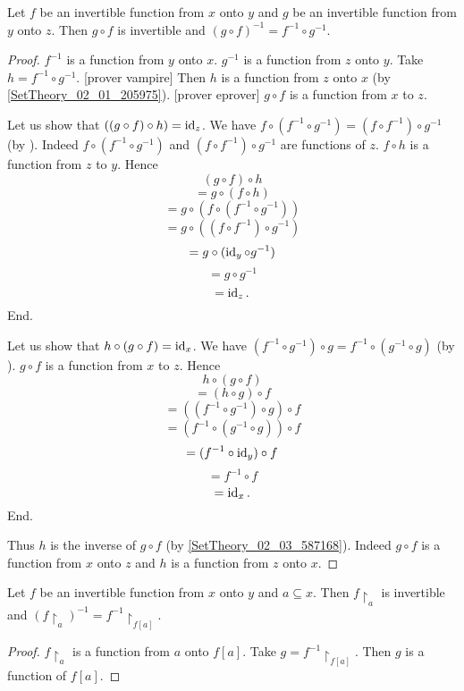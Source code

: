 \documentclass[../../set-theory.tex]{subfiles}
\begin{document}
\begin{forthel}
    \begin{proposition}\label{SetTheory_02_03_430030}
      Let $f$ be an invertible function from $x$ onto $y$ and $g$ be an invertible function from $y$ onto $z$.
      Then $g \circ f$ is invertible and $(g \circ f)^{-1} = f^{-1} \circ g^{-1}$.
    \end{proposition}
    \begin{proof}
      $f^{-1}$ is a function from $y$ onto $x$.
      $g^{-1}$ is a function from $z$ onto $y$.
      Take $h = f^{-1} \circ g^{-1}$.
      [prover vampire] %
      Then $h$ is a function from $z$ onto $x$ (by \ref{SetTheory_02_01_205975}).
      [prover eprover]
      $g \circ f$ is a function from $x$ to $z$.

      Let us show that $((g \circ f) \circ h) = \operatorname{id}_{z}$.
        We have $f \circ (f^{-1} \circ g^{-1}) = (f \circ f^{-1}) \circ g^{-1}$ (by ).
        Indeed $f \circ (f^{-1} \circ g^{-1})$ and $(f \circ f^{-1}) \circ g^{-1}$ are functions of $z$.
        $f \circ h$ is a function from $z$ to $y$.
        Hence
        \[   (g \circ f) \circ h \]
        \[ = g \circ (f \circ h) \]
        \[ = g \circ (f \circ (f^{-1} \circ g^{-1})) \]
        \[ = g \circ ((f \circ f^{-1}) \circ g^{-1}) \]
        \[ = g \circ (\operatorname{id}_{y} \circ g^{-1}) \]
        \[ = g \circ g^{-1} \]
        \[ = \operatorname{id}_{z}. \]
      End.

      Let us show that $h \circ (g \circ f) = \operatorname{id}_{x}$.
        We have $(f^{-1} \circ g^{-1}) \circ g = f^{-1} \circ (g^{-1} \circ g)$ (by ).
        $g \circ f$ is a function from $x$ to $z$.
        Hence
        \[   h \circ (g \circ f) \]
        \[ = (h \circ g) \circ f \]
        \[ = ((f^{-1} \circ g^{-1}) \circ g) \circ f \]
        \[ = (f^{-1} \circ (g^{-1} \circ g)) \circ f \]
        \[ = (f^{-1} \circ \operatorname{id}_{y}) \circ f \]
        \[ = f^{-1} \circ f \]
        \[ = \operatorname{id}_{x}. \]
      End.

      Thus $h$ is the inverse of $g \circ f$ (by \ref{SetTheory_02_03_587168}).
      Indeed $g \circ f$ is a function from $x$ onto $z$ and $h$ is a function from $z$ onto $x$.
    \end{proof}

    \begin{proposition}\label{SetTheory_02_03_908585}
      Let $f$ be an invertible function from $x$ onto $y$ and $a \subseteq x$.
      Then $f \restriction_{a}$ is invertible and $(f\restriction_{a})^{-1} = f^{-1} \restriction_{f[a]}$.
    \end{proposition}
    \begin{proof}
      $f \restriction_{a}$ is a function from $a$ onto $f[a]$.
      Take $g = f^{-1} \restriction_{f[a]}$.
      Then $g$ is a function of $f[a]$.


\end{proof}
\end{forthel}
\end{document}
